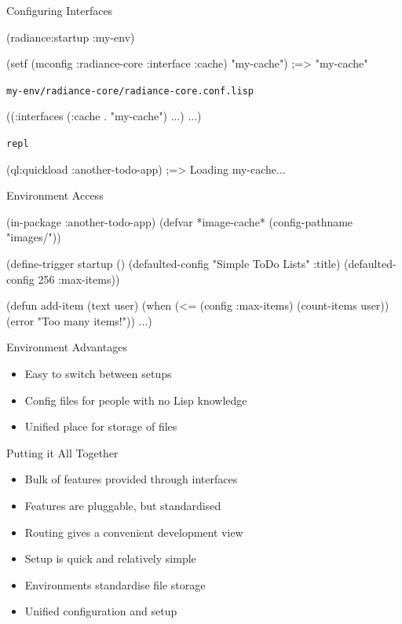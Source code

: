 \documentclass[14pt]{beamer}
\def\code#1{{\color{codecolor}\texttt{#1}}}
\renewcommand{\title}[1]{
  {\huge #1} \vskip 0.4cm
}
\begin{document}
\begin{frame}[fragile]
  \title{Configuring Interfaces}
\begin{lispcode}
(radiance:startup :my-env)

(setf (mconfig :radiance-core :interface :cache)
      "my-cache")
  ;=> "my-cache"
\end{lispcode}
  \pause
  \vskip 0.5cm
  {\footnotesize\code{my-env/radiance-core/radiance-core.conf.lisp}}
\begin{lispcode}
((:interfaces (:cache . "my-cache")
              ...)
 ...)
\end{lispcode}
  \pause
  \vskip 0.5cm
  {\footnotesize\code{repl}}
\begin{lispcode}
(ql:quickload :another-todo-app)
  ;=> Loading my-cache...
\end{lispcode}
\end{frame}

\begin{frame}[fragile]
  \title{Environment Access}
\begin{lispcode}
(in-package :another-todo-app)
(defvar *image-cache* (config-pathname "images/"))

(define-trigger startup ()
  (defaulted-config "Simple ToDo Lists" :title)
  (defaulted-config 256 :max-items))

(defun add-item (text user)
  (when (<= (config :max-items) (count-items user))
    (error "Too many items!"))
  ...)
\end{lispcode}
\end{frame}

\begin{frame}
  \title{Environment Advantages}
  \begin{itemize}
  \item Easy to switch between setups
  \item Config files for people with no Lisp knowledge
  \item Unified place for storage of files
  \end{itemize}
\end{frame}

\begin{frame}
  \title{Putting it All Together}
  \begin{itemize}
  \item Bulk of features provided through interfaces
  \item Features are pluggable, but standardised
    \pause
  \item Routing gives a convenient development view
  \item Setup is quick and relatively simple
    \pause
  \item Environments standardise file storage
  \item Unified configuration and setup
  \end{itemize}
\end{frame}
\end{document}
